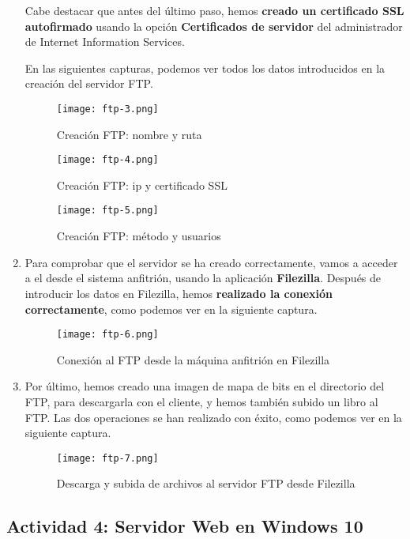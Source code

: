 \begin{enumerate}
    Cabe destacar que antes del último paso, hemos \textbf{creado un certificado SSL autofirmado} usando la opción \textbf{Certificados de servidor} del administrador de Internet Information Services.

    En las siguientes capturas, podemos ver todos los datos introducidos en la creación del servidor FTP.

    \begin{figure}[H]
        \centering
        \texttt{[image: ftp-3.png]}
        \caption{Creación FTP: nombre y ruta}
    \end{figure}

        \begin{figure}[H]
        \centering
        \texttt{[image: ftp-4.png]}
        \caption{Creación FTP: ip y certificado SSL}
    \end{figure}

    \begin{figure}[H]
        \centering
        \texttt{[image: ftp-5.png]}
        \caption{Creación FTP: método y usuarios}
    \end{figure}

    \item Para comprobar que el servidor se ha creado correctamente, vamos a acceder a el desde el sistema anfitrión, usando la aplicación \textbf{Filezilla}. Después de introducir los datos en Filezilla, hemos \textbf{realizado la conexión correctamente}, como podemos ver en la siguiente captura.

    \begin{figure}[H]
        \centering
        \texttt{[image: ftp-6.png]}
        \caption{Conexión al FTP desde la máquina anfitrión en Filezilla}
    \end{figure}

    \item Por último, hemos creado una imagen de mapa de bits en el directorio del FTP, para descargarla con el cliente, y hemos también subido un libro al FTP. Las dos operaciones se han realizado con éxito, como podemos ver en la siguiente captura.

    \begin{figure}[H]
        \centering
        \texttt{[image: ftp-7.png]}
        \caption{Descarga y subida de archivos al servidor FTP desde Filezilla}
    \end{figure}
\end{enumerate}

\subsection{Actividad 4: Servidor Web en Windows 10}

